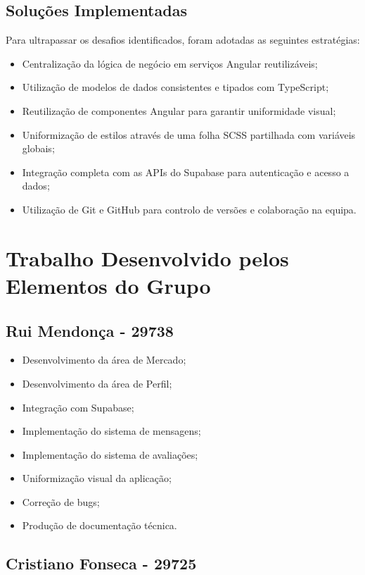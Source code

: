 \documentclass[12pt,a4paper]{article}
\begin{document}
\subsection{Soluções Implementadas}

Para ultrapassar os desafios identificados, foram adotadas as seguintes estratégias:

\begin{itemize}
\setlength{\itemsep}{0.15em}
\item Centralização da lógica de negócio em serviços Angular reutilizáveis;
\item Utilização de modelos de dados consistentes e tipados com TypeScript;
\item Reutilização de componentes Angular para garantir uniformidade visual;
\item Uniformização de estilos através de uma folha SCSS partilhada com variáveis globais;
\item Integração completa com as APIs do Supabase para autenticação e acesso a dados;
\item Utilização de Git e GitHub para controlo de versões e colaboração na equipa.
\end{itemize}

\section{Trabalho Desenvolvido pelos Elementos do Grupo}

\subsection{Rui Mendonça - 29738}

\begin{itemize}
\setlength{\itemsep}{0.15em}
\item Desenvolvimento da área de Mercado;
\item Desenvolvimento da área de Perfil;
\item Integração com Supabase;
\item Implementação do sistema de mensagens;
\item Implementação do sistema de avaliações;
\item Uniformização visual da aplicação;
\item Correção de bugs;
\item Produção de documentação técnica.
\end{itemize}

\subsection{Cristiano Fonseca - 29725}
\end{document}
